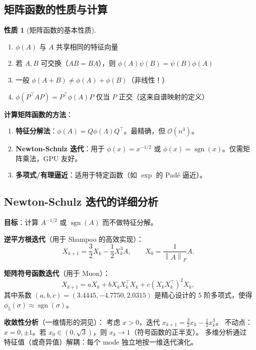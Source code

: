 \documentclass[12pt,a4paper]{ctexart}
\theoremstyle{definition}
\newtheorem{property}[theorem]{性质}
\theoremstyle{plain}
\newcommand{\norm}[1]{\left\lVert #1 \right\rVert}
\DeclareMathOperator{\sgn}{sgn}
\begin{document}
\subsection{矩阵函数的性质与计算}

\begin{property}[矩阵函数的基本性质]
  \begin{enumerate}[label=(\arabic*)]
    \item $\phi(A)$ 与 $A$ 共享相同的特征向量
    \item 若 $A,B$ 可交换（$AB=BA$），则 $\phi(A)\psi(B)=\psi(B)\phi(A)$
    \item 一般 $\phi(A+B)\neq\phi(A)+\phi(B)$（非线性！）
    \item $\phi(P^\top A P) = P^\top\phi(A)P$ 仅当 $P$ 正交（这来自谱映射的定义）
  \end{enumerate}
\end{property}

\textbf{计算矩阵函数的方法}：
\begin{enumerate}[label=(\arabic*)]
  \item \textbf{特征分解法}：$\phi(A)=Q\phi(\Lambda)Q^\top$。最精确，但 $\mathcal{O}(n^3)$。
  \item \textbf{Newton-Schulz 迭代}：用于 $\phi(x)=x^{-1/2}$ 或 $\phi(x)=\sgn(x)$。仅需矩阵乘法，GPU 友好。
  \item \textbf{多项式/有理逼近}：适用于特定函数（如 $\exp$ 的 Pad\'e 逼近）。
\end{enumerate}

\subsection{Newton-Schulz 迭代的详细分析}

\textbf{目标}：计算 $A^{-1/2}$ 或 $\sgn(A)$ 而不做特征分解。

\vspace{0.2cm}
\textbf{逆平方根迭代}（用于 Shampoo 的高效实现）：
\[
  X_{k+1} = \frac{3}{2}X_k - \frac{1}{2}X_k^3 A,\qquad X_0 = \frac{1}{\norm{A}_F}A.
\]

\vspace{0.2cm}
\textbf{矩阵符号函数迭代}（用于 Muon）：
\[
  X_{k+1} = a X_k + b X_k X_k^\top X_k + c (X_k X_k^\top)^2 X_k,
\]
其中系数 $(a,b,c) = (3.4445, -4.7750, 2.0315)$ 是精心设计的 5 阶多项式，使得 $\phi_5(\sigma)\approx\sgn(\sigma)$。

\vspace{0.2cm}
\textbf{收敛性分析}（一维情形的洞见）：
考虑 $x>0$，迭代 $x_{k+1}=\frac{3}{2}x_k-\frac{1}{2}x_k^3$。
不动点：$x=0,\pm1$。若 $x_0\in(0,\sqrt{3})$，则 $x_k\to1$（符号函数的正半支）。
多维分析通过特征值（或奇异值）解耦：每个 mode 独立地按一维迭代演化。
\end{document}
